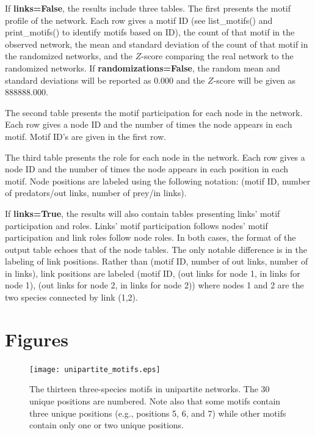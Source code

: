 \documentclass[12pt]{article}
\begin{document}
			If \textbf{links=False}, the results include three tables. The first presents the motif profile of the network. Each row gives a motif ID (see list\_motifs() and print\_motifs() to identify motifs based on ID), the count of that motif in the observed network, the mean and standard deviation of the count of that motif in the randomized networks, and the $Z$-score comparing the real network to the randomized networks. If \textbf{randomizations=False}, the random mean and standard deviations will be reported as 0.000 and the $Z$-score will be given as 888888.000.
			
			The second table presents the motif participation for each node in the network. Each row gives a node ID and the number of times the node appears in each motif. Motif ID's are given in the first row.
			
			The third table presents the role for each node in the network. Each row gives a node ID and the number of times the node appears in each position in each motif. Node positions are labeled using the following notation: (motif ID, number of predators/out links, number of prey/in links).

			If \textbf{links=True}, the results will also contain tables presenting links' motif participation and roles. Links' motif participation follows nodes' motif participation and link roles follow node roles. In both cases, the format of the output table echoes that of the node tables. The only notable difference is in the labeling of link positions. Rather than (motif ID, number of out links, number of in links), link positions are labeled (motif ID, (out links for node 1, in links for node 1), (out links for node 2, in links for node 2)) where nodes 1 and 2 are the two species connected by link (1,2).

\clearpage

\section{Figures}

	\begin{figure}[ht]
	  \centering
		\texttt{[image: unipartite\_motifs.eps]}
		\caption{The thirteen three-species motifs in unipartite networks. The 30 unique positions are numbered. Note also that some motifs contain three unique positions (e.g., positions 5, 6, and 7) while other motifs contain only one or two unique positions.}
		\label{fig:3sp_unipartite}
	\end{figure}
\end{document}
